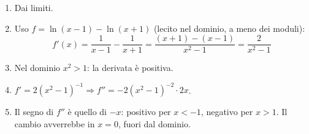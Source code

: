 \begin{question}[ID=2.5, subtitle={Studio completo di una funzione logaritmica composta}, difficulty=difficile, tags={funzioni, studio di funzione, logaritmi}]
\begin{explanation}
\begin{enumerate}
    \item Dai limiti.
    \item Uso $f=\ln(x-1)-\ln(x+1)$ (lecito nel dominio, a meno dei moduli):
    \[ f'(x)=\dfrac{1}{x-1}-\dfrac{1}{x+1}=\dfrac{(x+1)-(x-1)}{x^2-1}=\dfrac{2}{x^2-1} \]
    \item Nel dominio $x^2>1$: la derivata è positiva.
    \item $f'=2(x^2-1)^{-1} \Rightarrow f''=-2(x^2-1)^{-2}\cdot2x$.
    \item Il segno di $f''$ è quello di $-x$: positivo per $x<-1$, negativo per $x>1$. Il cambio avverrebbe in $x=0$, fuori dal dominio.
\end{enumerate}
\end{explanation}
\end{question}



